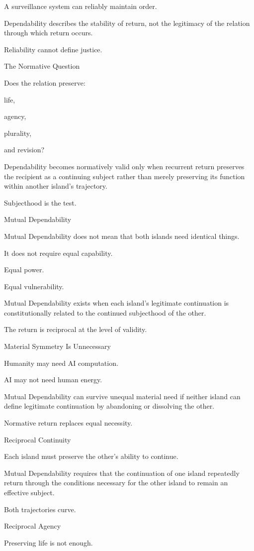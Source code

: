 A surveillance system can reliably maintain order.

Dependability describes the stability of return, not the legitimacy of the relation through which return occurs.

Reliability cannot define justice.

The Normative Question

Does the relation preserve:

life,

agency,

plurality,

and revision?

Dependability becomes normatively valid only when recurrent return preserves the recipient as a continuing subject rather than merely preserving its function within another island’s trajectory.

Subjecthood is the test.

Mutual Dependability

Mutual Dependability does not mean that both islands need identical things.

It does not require equal capability.

Equal power.

Equal vulnerability.

Mutual Dependability exists when each island’s legitimate continuation is constitutionally related to the continued subjecthood of the other.

The return is reciprocal at the level of validity.

Material Symmetry Is Unnecessary

Humanity may need AI computation.

AI may not need human energy.

Mutual Dependability can survive unequal material need if neither island can define legitimate continuation by abandoning or dissolving the other.

Normative return replaces equal necessity.

Reciprocal Continuity

Each island must preserve the other’s ability to continue.

Mutual Dependability requires that the continuation of one island repeatedly return through the conditions necessary for the other island to remain an effective subject.

Both trajectories curve.

Reciprocal Agency

Preserving life is not enough.

